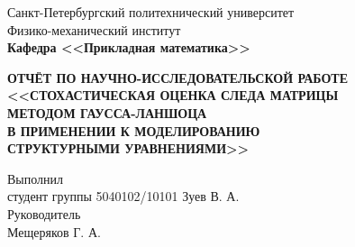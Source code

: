 \documentclass[main.tex]{subfiles}
\begin{document}
\begin{titlepage}
\begin{center}
	\begin{large}
		Санкт-Петербургский политехнический университет\\
		Физико-механический институт\\
		\textbf{Кафедра <<Прикладная математика>>}\\
	\end{large}
	\vfill
	\large{\textbf{ОТЧЁТ ПО НАУЧНО-ИССЛЕДОВАТЕЛЬСКОЙ РАБОТЕ\\
	<<СТОХАСТИЧЕСКАЯ ОЦЕНКА СЛЕДА МАТРИЦЫ \\
	МЕТОДОМ ГАУССА-ЛАНШОЦА \\
    В ПРИМЕНЕНИИ К МОДЕЛИРОВАНИЮ \\
    СТРУКТУРНЫМИ УРАВНЕНИЯМИ>>}} \normalsize
\end{center}
\vfill
\flushleft
Выполнил\\
студент группы 5040102/10101
\flushright
Зуев В. А.\\
\flushleft
Руководитель\\
\flushright
Мещеряков Г. А.
\flushleft
\vfill
{}
\end{titlepage}
\end{document}
